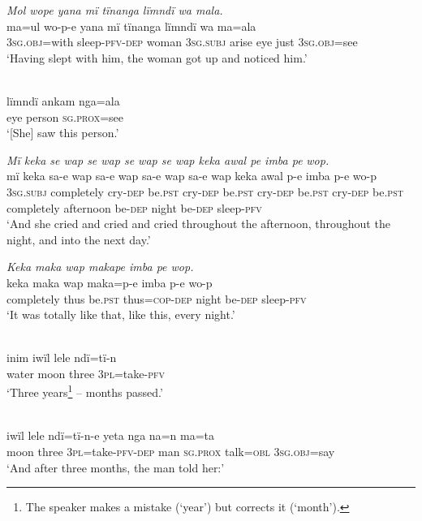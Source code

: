 \newpage

\ex \negmedspace \textit{Mol w}{\textit{o}}\textit{pe y}{\textit{a}}\textit{na mï tïnanga lïmndï wa mala.}\\
\gll m{a=u}l      w{o-}p{{}-}e      y{a}na  mï      tïnanga    lïmndï  wa ma=ala\\
3\textsc{sg.obj}=with  sleep-\textsc{pfv-dep}  woman  3\textsc{sg.subj}  arise    eye    just 3\textsc{sg.obj}=see\\
\glt ‘Having slept {with him}, the woman got up and noticed him.’

\ex {}\\
\gll lïmndï  ankam  nga=ala\\
eye    person  \textsc{sg.prox}=see\\
\glt ‘[She] saw this person.’

\ex \negmedspace \textit{Mï keka se wap se wap se wap se wap keka awal pe imba pe} {\textit{wop.}}\\
\gll mï      keka      sa-e wap  sa-e    wap  sa-e wap  sa-e wap  keka      awal p{{}-}e    imba p{{}-}e {wo-p}\\
3\textsc{sg.subj}  completely  cry-\textsc{dep}  be.\textsc{pst}  cry-\textsc{dep}  be.\textsc{pst}  cry-\textsc{dep} be.\textsc{pst}  cry-\textsc{dep}  be.\textsc{pst}  completely  afternoon  be-\textsc{dep}  night  be\textsc{{}-dep} sleep-\textsc{pfv}\\
\glt ‘{And she cried and cried and cried} throughout the afternoon, throughout the night, and into the next day.’

\ex \negmedspace \textit{Keka maka wap makape imba pe w}{\textit{o}}\textit{p.}\\
\gll keka      maka wap  maka=p{{}-}e    imba p{{}-}e    w{o-}p\\
completely  thus  be.\textsc{pst}  thus=\textsc{cop}{}-\textsc{dep}  night  be-\textsc{dep}  sleep-\textsc{pfv}\\
\glt ‘It was totally like that, like this, {every} night.’

\ex {}\\
\gll inim  iwïl  lele    ndï{=}tï{{}-}n\\
water  moon  three  3\textsc{pl}=take-\textsc{pfv}\\
\glt ‘Three years\footnote{The speaker makes a mistake (‘year’) but corrects it (‘month’).} -- months passed.’

\ex {}\\
\gll iwïl  lele    ndï{=}tï{{}-}n{{}-}e       yeta  nga    na{=}n    ma{=}ta\\
moon  three  3\textsc{pl}=take-\textsc{pfv-dep}  man  \textsc{sg.prox}  talk=\textsc{obl}  3\textsc{sg.obj}=say\\
\glt ‘And after three months, the man told her:’


